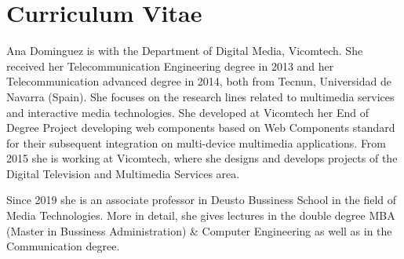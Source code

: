 

\chapter{Curriculum Vitae}

Ana Dominguez is with the Department of Digital Media, Vicomtech. She received her Telecommunication Engineering degree in 2013 and her Telecommunication advanced degree in 2014, both from Tecnun, Universidad de Navarra (Spain). 
She focuses on the research lines related to multimedia services and interactive media technologies. She developed at Vicomtech her End of Degree Project developing web components based on Web Components standard for their subsequent integration on multi-device multimedia applications. From 2015 she is working at Vicomtech, where she designs and develops projects of the Digital Television and Multimedia Services area.

Since 2019 she is an associate professor in Deusto Bussiness School in the field of Media Technologies. More in detail, she gives lectures in the double degree MBA (Master in Bussiness Administration) \& Computer Engineering as well as in the Communication degree.
